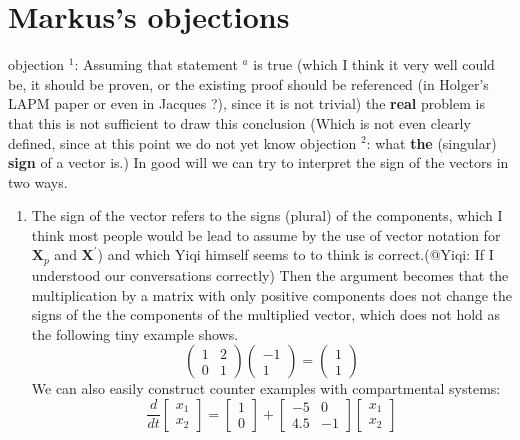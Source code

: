 \documentclass{article}
\newcommand{\om}[1]{{\color{red} objection $^{#1}$}: }
\newcommand{\cm}[1]{{\color{green} statement $^{#1}$} }
\newcommand{\X}{\mathbf{X}}
\begin{document}
\section{Markus's objections}
\om{1}
Assuming that \cm{a} is true (which I think it very well could be, it should be proven, or the existing proof should be referenced (in  Holger's LAPM paper or even in Jacques ?), since it is not trivial) 
the {\bf real} problem is that this is not sufficient to draw this conclusion (Which is not even clearly defined,  since at this point we do not yet know \om{2}  what  {\bf the }(singular) {\bf sign} of a vector is.)
In good will we can try to interpret the sign of the vectors in two ways. 
\begin{enumerate}
  \item
     The sign of the vector refers to the signs (plural) of the components, 
     which I think most people would be lead to assume by the use of vector notation for $\X_p$ and $\X^{\prime}$) and which Yiqi himself seems to to think is correct.(@Yiqi: If I understood  our conversations correctly)  
    Then the argument becomes that the multiplication by a matrix with only positive components 
    does not  change the signs of the the components of the multiplied vector, which does not hold 
    as the following tiny example shows. 
    $$
     \left(
        \begin{matrix}
            1 &2 \\   
            0 &1   
         \end{matrix}
    \right)
    \left(
        \begin{matrix}
            -1 \\   
             1   
         \end{matrix}
    \right)
    =
    \left(
        \begin{matrix}
             1 \\   
             1   
         \end{matrix}
    \right)
    $$
    We can also easily construct counter examples  with compartmental systems:
    $$
    \frac{d}{dt}\left[\begin{matrix}x_{1}\\x_{2}\end{matrix}\right]=\left[\begin{matrix}1\\0\end{matrix}\right]+\left[\begin{matrix}-5 & 0\\4.5 & -1\end{matrix}\right]\left[\begin{matrix}x_{1}\\x_{2}\end{matrix}\right]
$$
\end{enumerate}
\end{document}
